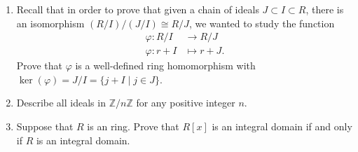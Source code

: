 \documentclass[12pt]{article}
\newcommand{\bbZ}{\mathbb{Z}}
\newcommand{\solution}[1]{\textcolor{red}{#1}}
\renewcommand{\solution}[1]{}
\begin{document}
\pagestyle{fancy}


\begin{enumerate}
\item Recall that in order to prove that given a chain of ideals
  $J\subset I \subset R$, there is an isomorphism $(R/I)/(J/I)\cong
  R/J$, we wanted to study the function
  \begin{align*}
    \varphi: R/I &\rightarrow R/J\\
    \varphi: r+I &\mapsto r+J.
  \end{align*}
Prove that $\varphi$ is a well-defined ring homomorphism with
$\ker(\varphi)=J/I =\{j+I\mid j\in J\}$. 
\solution{
[Well-defined] Suppose that $r_1+I=r_2+I$. Equivalently, $r_1-r_2\in
I$. Then
\begin{align*}
  \varphi(r_1+I) &= r_1+J\\
  \varphi(r_2+I)&= r_2+J.
\end{align*}
But $r_1-r_2\in I\subset J$, so $r_1+J=r_2+J$. Hence,
$\varphi(r_1+I)=\varphi(r_2+I)$. 
[Homomorphism] Suppose that $r,s\in R$. Then
\begin{align*}
  \varphi((r+I)+(s+I)) &= \varphi((r+s)+I) \
&= r+s+J\\
&= (r+J)+(s+J)\\
&= \varphi(r+I)+\varphi(s+I).
\end{align*}
The multiplication is similar. 
[Kernel] We have $x+I\in \ker(\varphi)$ if and only if
$\varphi(x+I)=x+J=0+J$, which holds if and only if $x\in J$. Thus,
$\ker(\varphi)=\{x+I \mid x\in J\}$, which we denote $J/I$.
}
\item Describe all ideals in $\bbZ/n\bbZ$ for any positive integer
  $n$. 
\solution{
Recall that in any ring $R$ and for any ideal $I$, there is a
bijection between ideals $J$ containing $I$ and ideals in $R/I$. Thus,
the ideals in $\bbZ/n\bbZ$ are all associated with ideals $m\bbZ$ in
$\bbZ$ that contain $n\bbZ$. But these are precisely the ideals
$m\bbZ$ with $m\mid n$. Hence, for each $m\mid n$, there is an ideal
$m\bbZ/n\bbZ$ consisting of all multiples of $[m]$ in $\bbZ/n\bbZ$.}
\item Suppose that $R$ is an ring. Prove that $R[x]$ is an integral
  domain if and only if $R$ is an integral domain.
\solution{
First, $R$ can be viewed as a subset of $R[x]$ by inclusion as the
constant polynomials. Thus, if $R$ is not an integral domain, $R[x]$
cannot be either. On the other hand, suppose that $R$ is an integral
domain. Define the function $\deg: R[x]\rightarrow \bbZ$ by taking the
degree of a polynomial to be the largest power of $x$ that occurs in a
}
\end{enumerate}
\end{document}
